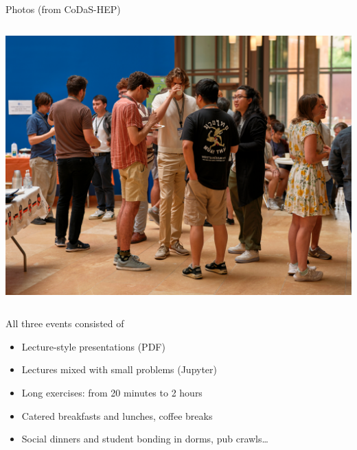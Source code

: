 \documentclass[aspectratio=169]{beamer}
\begin{document}
\begin{frame}{Photos (from CoDaS-HEP)}
\begin{columns}
\includegraphics[width=\linewidth]{PHOTOS/DSCF2642.jpg}
\end{columns}
\end{frame}

\begin{frame}{All three events consisted of}
\Large
\vspace{0.5 cm}
\begin{itemize}\setlength{\itemsep}{0.25 cm}
\item<1-> Lecture-style presentations (PDF)
\item<2-> Lectures mixed with small problems (Jupyter)
\item<3-> Long exercises: from 20 minutes to 2 hours
\item<4-> Catered breakfasts and lunches, coffee breaks
\item<5-> Social dinners and student bonding in dorms, pub crawls\ldots
\end{itemize}

\vspace{0.5 cm}
\large
{}

\vspace{0.25 cm}
\end{frame}
\end{document}

